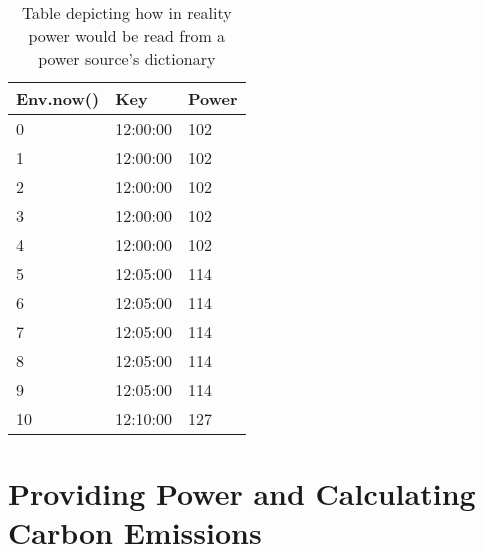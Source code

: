 \documentclass{l4proj}
\begin{document}
\begin{table}[h]
    \vspace{1em} %
    \caption{Table depicting how in reality power would be read from a power source's dictionary}
    \label{tab:time-explanation}
    \begin{tabular}{@{}lll@{}}
    \toprule
    \textbf{Env.now()}    & \textbf{Key}       & \textbf{Power}     \\
    \midrule
    0                     & 12:00:00           & 102                \\
    1                     & 12:00:00           & 102                \\
    2                     & 12:00:00           & 102                \\
    3                     & 12:00:00           & 102                \\
    4                     & 12:00:00           & 102                \\
    5                     & 12:05:00           & 114                \\
    6                     & 12:05:00           & 114                \\
    7                     & 12:05:00           & 114                \\
    8                     & 12:05:00           & 114                \\
    9                     & 12:05:00           & 114                \\
    10                    & 12:10:00           & 127                \\
    \bottomrule
    \end{tabular}
\end{table}

\section{Providing Power and Calculating Carbon Emissions}
\end{document}
